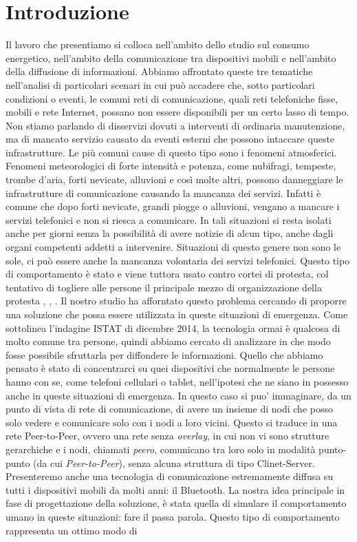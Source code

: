 \chapter{Introduzione}
\label{chap:Introduzione}

Il lavoro che presentiamo si colloca nell'ambito dello studio sul consumo energetico, nell'ambito della comunicazione tra dispositivi mobili e nell'ambito della diffusione di informazioni. Abbiamo affrontato queste tre tematiche nell'analisi di particolari scenari in cui può accadere che, sotto particolari condizioni o eventi, le comuni reti di comunicazione, quali reti telefoniche fisse, mobili e rete Internet, possano non essere disponibili per un certo lasso di tempo. Non stiamo parlando di disservizi dovuti a interventi di ordinaria manutenzione, ma di mancato servizio causato da eventi esterni che possono intaccare queste infrastrutture. Le più comuni cause di questo tipo sono i fenomeni atmosferici. Fenomeni meteorologici di forte intensità e potenza, come nubifragi, tempeste, trombe d'aria, forti nevicate, alluvioni e così molte altri, possono danneggiare le infrastrutture di comunicazione causando la mancanza dei servizi. Infatti è comune che dopo forti nevicate, grandi piogge o alluvioni, vengano a mancare i servizi telefonici e non si riesca a comunicare. In tali situazioni si resta isolati anche per giorni senza la possibilità di avere notizie di alcun tipo, anche dagli organi competenti addetti a intervenire. Situazioni di questo genere non sono le sole, ci può essere anche la mancanza volontaria dei servizi telefonici. Questo tipo di comportamento è stato e viene tuttora usato contro cortei di protesta, col tentativo di togliere alle persone il principale mezzo di organizzazione della protesta \cite{wemakehistory2014-articolo}, \cite{wemakehistory2014-fattoq}, \cite{wemakehistory2014-lastampa}. Il nostro studio ha afforntato questo problema cercando di proporre una soluzione che possa essere utilizzata in queste situazioni di emergenza. Come sottolinea l'indagine ISTAT di dicembre 2014\cite{istat2014}, la tecnologia ormai è qualcosa di molto comune tra persone, quindi abbiamo cercato di analizzare in che modo fosse possibile sfruttarla per diffondere le informazioni. Quello che abbiamo pensato è stato di concentrarci su quei dispositivi che normalmente le persone hanno con se, come telefoni cellulari o tablet, nell'ipotesi che ne siano in possesso anche in queste situazioni di emergenza. In questo caso si puo' immaginare, da un punto di vista di rete di comunicazione, di avere un insieme di nodi che posso solo vedere e comunicare solo con i nodi a loro vicini. Questo si traduce in una rete Peer-to-Peer, ovvero una rete senza \textit{overlay}, in cui non vi sono strutture gerarchiche e i nodi, chiamati \textit{peero}, comunicano tra loro solo in modalità punto-punto (da cui \textit{Peer-to-Peer}), senza alcuna struttura di tipo Clinet-Server. Presenteremo anche una tecnologia di comunicazione estremamente diffusa su tutti i dispositivi mobili da molti anni: il Bluetooth. La nostra idea principale in fase di progettazione della soluzione, è stata quella di simulare il comportamento umano in queste situazioni: fare il passa parola. Questo tipo di comportamento rappresenta un ottimo modo di 